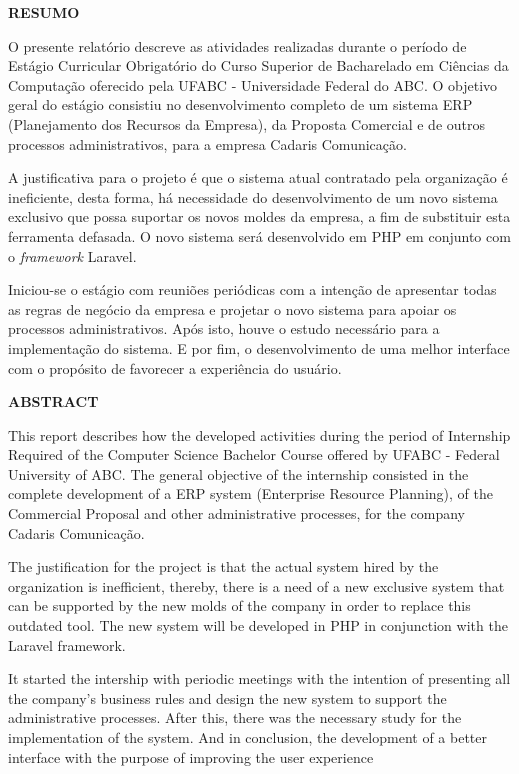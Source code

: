 \documentclass[
  12pt,				%
  openany,
  oneside,
  a4paper,			%
  english,			%
  brazil
]{article}
\numberwithin{figure}{section}
\numberwithin{table}{section}
\begin{document}
\begin{titlepage}

\begin{center}
  \textbf{RESUMO}
\end{center}

O presente relatório descreve as atividades realizadas durante o período de Estágio Curricular Obrigatório do Curso Superior de Bacharelado em Ciências da Computação oferecido pela UFABC - Universidade Federal do ABC. O objetivo geral do estágio consistiu no desenvolvimento completo de um sistema ERP (Planejamento dos Recursos da Empresa), da Proposta Comercial e de outros processos administrativos, para a empresa Cadaris Comunicação.

A justificativa para o projeto é que o sistema atual contratado pela organização é ineficiente, desta forma, há necessidade do desenvolvimento de um novo sistema exclusivo que possa suportar os novos moldes da empresa, a fim de substituir esta ferramenta defasada. O novo sistema será desenvolvido em PHP em conjunto com o \textit{framework} Laravel. 

Iniciou-se o estágio com reuniões periódicas com a intenção de apresentar todas as regras de negócio da empresa e projetar o novo sistema para apoiar os processos administrativos. Após isto, houve o estudo necessário para a implementação do sistema. E por fim, o desenvolvimento de uma melhor interface com o propósito de favorecer a experiência do usuário.

\end{titlepage}


\begin{titlepage}

\begin{center}
  \textbf{ABSTRACT}
\end{center}

This report describes how the developed activities during the period of Internship Required of the Computer Science Bachelor Course offered by UFABC - Federal University of ABC. The general objective of the internship consisted in the complete development of a ERP system (Enterprise Resource Planning), of the Commercial Proposal and other administrative processes, for the company Cadaris Comunicação.

The justification for the project is that the actual system hired by the organization is inefficient, thereby, there is a need of a new exclusive system that can be supported by the new molds of the company in order to replace this outdated tool. The new system will be developed in PHP in conjunction with the Laravel framework. 

It started the intership with periodic meetings with the intention of presenting all the company's business rules and design the new system to support the administrative processes. After this, there was the necessary study for the implementation of the system. And in conclusion, the development of a better interface with the purpose of improving the user experience

\end{titlepage}
\end{document}
